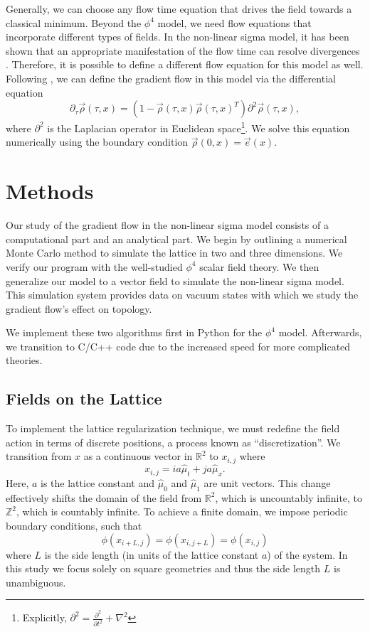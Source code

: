 \documentclass[12pt]{report}
\newcommand{\e}{\vec e}
\begin{document}
Generally, we can choose any flow time equation that drives the field towards a classical minimum. Beyond the $\phi^4$ model, we need flow equations that incorporate different types of fields. In the non-linear sigma model, it has been shown that an appropriate manifestation of the flow time can resolve divergences \cite{makino2015a}. Therefore, it is possible to define a different flow equation for this model as well. Following \cite{bietenholz2018}, we can define the gradient flow in this model via the differential equation
\begin{equation}
    \label{eq:nsm_gradflow}
    \partial_\tau \vec\rho (\tau,x) = \left( 1 - \vec\rho(\tau,x) \vec\rho(\tau,x)^T \right) \partial^2 \vec\rho(\tau,x),
\end{equation}
where $\partial^2$ is the Laplacian operator in Euclidean space\footnote{Explicitly, $\partial^2 = \frac{\partial^2}{\partial t^2} + \nabla^2$}. We solve this equation numerically using the boundary condition $\vec\rho(0,x) = \e(x)$.



\chapter{Methods}
\label{sec:methods}
Our study of the gradient flow in the non-linear sigma model consists of a computational part and an analytical part. We begin by outlining a numerical Monte Carlo method to simulate the lattice in two and three dimensions. We verify our program with the well-studied $\phi^4$ scalar field theory. We then generalize our model to a vector field to simulate the non-linear sigma model. This simulation system provides data on vacuum states with which we study the gradient flow's effect on topology.

We implement these two algorithms first in Python for the $\phi^4$ model. Afterwards, we transition to C/C++ code due to the increased speed for more complicated theories. 
\section{Fields on the Lattice}
To implement the lattice regularization technique, we must redefine the field action in terms of discrete positions, a process known as ``discretization''. We transition from $x$ as a continuous vector in $\mathbb{R}^2$ to $x_{i,j}$ where
\begin{equation}
    x_{i,j} = ia \hat{\mu}_t + j a \hat{\mu}_x.
\end{equation}
Here, $a$ is the lattice constant and $\hat{\mu}_0$ and $\hat{\mu}_1$ are unit vectors. This change effectively shifts the domain of the field from $\mathbb{R}^2$, which is uncountably infinite, to $\mathbb{Z}^2$, which is countably infinite. To achieve a finite domain, we impose periodic boundary conditions, such that 
\begin{equation}
    \phi\left(x_{i+L,j}\right) = \phi\left(x_{i,j+L}\right) = \phi\left(x_{i,j}\right)
\end{equation}
where $L$ is the side length (in units of the lattice constant $a$) of the system. In this study we focus solely on square geometries and thus the side length $L$ is unambiguous.
\end{document}
